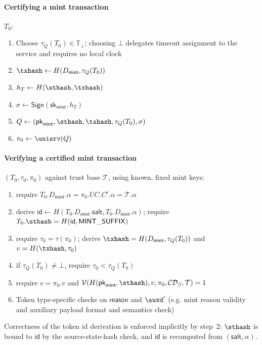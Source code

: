 \paragraph{Certifying a mint transaction} $T_0$:
\begin{enumerate}
	\item Choose $\tau_Q(T_0)\in\mathbb{T}_\bot$; choosing $\bot$ delegates timeout assignment to the service and requires no local clock
	\item $\txhash \gets H(D_\mathsf{mint}, \tau_Q(T_0))$
	\item $h_T \gets H(\sthash, \txhash)$
	\item $\sigma \gets \mathsf{Sign}(\mathsf{sk}_\mathsf{mint}, h_T)$
	\item $Q \gets (\mathsf{pk}_\mathsf{mint}, \sthash, \txhash, \tau_Q(T_0), \sigma)$
	\item $\pi_0 \gets \unisrv(Q)$
\end{enumerate}

\paragraph{Verifying a certified mint transaction} $(T_0, \tau_0, \pi_0)$ against trust base $\mathcal{T}$, using known, fixed mint keys:
\begin{enumerate}
	\item require $T_0.D_\mathsf{mint}.\alpha = \pi_0.UC.C^\mathsf{r}.\alpha = \mathcal{T}.\alpha$
	\item derive $\mathsf{id} \gets H(T_0.D_\mathsf{mint}.\mathsf{salt}, T_0.D_\mathsf{mint}.\alpha)$;\; require $T_0.\sthash = H(\mathsf{id}, \mathsf{MINT\_SUFFIX})$
	\item require $\tau_0=\tau(\pi_0)$; derive $\txhash=H(D_\mathsf{mint},\tau_Q(T_0))$ and $v=H(\txhash,\tau_0)$
	\item if $\tau_Q(T_0)\ne\bot$, require $\tau_0 < \tau_Q(T_0)$
	\item require $v = \pi_0.v$ and $\mathcal{V}(H(\mathsf{pk}_\mathsf{mint}, \sthash), v, \pi_0, \mathcal{CD}_\beta, \mathcal{T}) = 1$
	\item Token type-specific checks on $\mathsf{reason}$ and $\auxd'$ (e.g. mint reason validity and auxiliary payload format and semantics check)
\end{enumerate}

Correctness of the token id derivation is enforced implicitly by step~2: $\sthash$ is bound to $\mathsf{id}$ by the source-state-hash check, and $\mathsf{id}$ is recomputed from $(\mathsf{salt}, \alpha)$.


